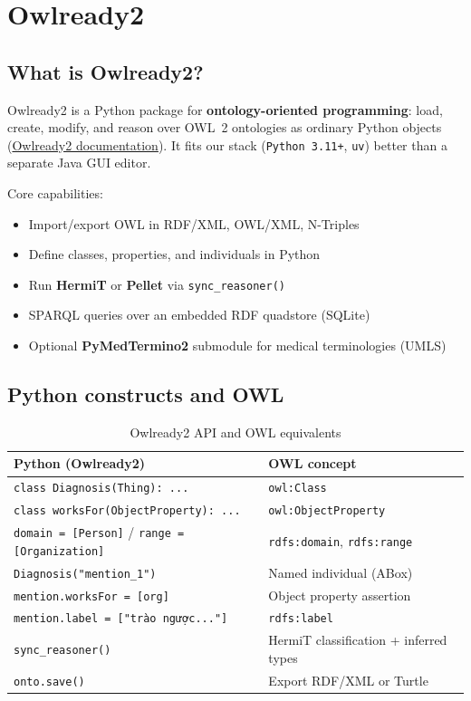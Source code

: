 \section{Owlready2}

\subsection{What is Owlready2?}

Owlready2 is a Python package for \textbf{ontology-oriented programming}: load,
create, modify, and reason over OWL~2 ontologies as ordinary Python objects
(\href{https://owlready2.readthedocs.io/en/latest/intro.html}{Owlready2 documentation}).
It fits our stack (\texttt{Python 3.11+}, \texttt{uv}) better than a separate
Java GUI editor.

Core capabilities:
\begin{itemize}
  \item Import/export OWL in RDF/XML, OWL/XML, N-Triples
  \item Define classes, properties, and individuals in Python
  \item Run \textbf{HermiT} or \textbf{Pellet} via \texttt{sync\_reasoner()}
  \item SPARQL queries over an embedded RDF quadstore (SQLite)
  \item Optional \textbf{PyMedTermino2} submodule for medical terminologies (UMLS)
\end{itemize}

\subsection{Python constructs and OWL}

\begin{table}[htbp]
  \centering
  \small
  \caption{Owlready2 API and OWL equivalents}
  \label{tab:owlready2-owl}
  \renewcommand{\arraystretch}{1.2}
  \begin{tabularx}{\textwidth}{@{}l X@{}}
    \toprule
    \textbf{Python (Owlready2)} & \textbf{OWL concept} \\
    \midrule
    \texttt{class Diagnosis(Thing): ...} & \texttt{owl:Class} \\
    \texttt{class worksFor(ObjectProperty): ...} & \texttt{owl:ObjectProperty} \\
    \texttt{domain = [Person]} / \texttt{range = [Organization]} &
    \texttt{rdfs:domain}, \texttt{rdfs:range} \\
    \texttt{Diagnosis("mention\_1")} & Named individual (ABox) \\
    \texttt{mention.worksFor = [org]} & Object property assertion \\
    \texttt{mention.label = ["trào ngược..."]} & \texttt{rdfs:label} \\
    \texttt{sync\_reasoner()} & HermiT classification + inferred types \\
    \texttt{onto.save()} & Export RDF/XML or Turtle \\
    \bottomrule
  \end{tabularx}
\end{table}

